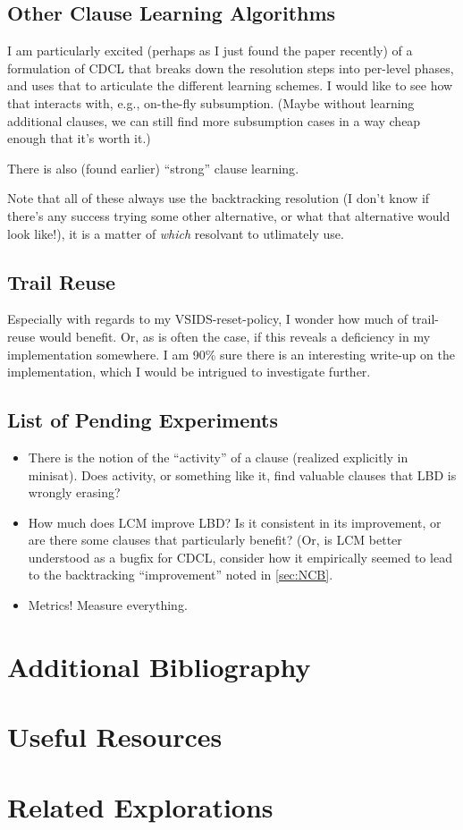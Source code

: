 \documentclass{article}
\begin{document}
\subsection{Other Clause Learning Algorithms}\label{sec:future:clause-learning}
I am particularly excited (perhaps as I just found the paper recently) of a formulation\cite{fengbacchus2020} of CDCL that breaks down the resolution steps into per-level phases, and uses that to articulate the different learning schemes.
I would like to see how that interacts with, e.g., on-the-fly subsumption.
(Maybe without learning additional clauses, we can still find more subsumption cases in a way cheap enough that it's worth it.)

There is also (found earlier) ``strong'' clause learning\cite{jinsomenzi2006}.

Note that all of these always use the backtracking resolution (I don't know if there's any success trying some other alternative, or what that alternative would look like!), it is a matter of \emph{which} resolvant to utlimately use.
\subsection{Trail Reuse}
Especially with regards to my VSIDS-reset-policy, I wonder how much of trail-reuse\cite{ramovandertakheule2011} would benefit.
Or, as is often the case, if this reveals a deficiency in my implementation somewhere.
I am 90\% sure there is an interesting write-up on the implementation\cite{vandertakramosheule2011}, which I would be intrigued to investigate further.

\subsection{List of Pending Experiments}
\begin{itemize}
    \item There is the notion of the ``activity'' of a clause (realized explicitly in minisat). Does activity, or something like it, find valuable clauses that LBD is wrongly erasing?
    \item How much does LCM improve LBD? Is it consistent in its improvement, or are there some clauses that particularly benefit? (Or, is LCM better understood as a bugfix for CDCL, consider how it empirically seemed to lead to the backtracking ``improvement'' noted in \cref{sec:NCB}.
    \item Metrics! Measure everything.
\end{itemize}

\section{Additional Bibliography}

\section{Useful Resources}

\section{Related Explorations}

\printbibliography
\end{document}
